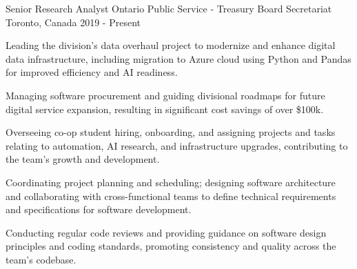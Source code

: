 

\begin{cventries}


\cventry
  {Senior Research Analyst}
  {Ontario Public Service - Treasury Board Secretariat}
  {Toronto, Canada}
  {2019 - Present}
  {
    \begin{cvitems}
      \item Leading the division's data overhaul project to modernize and enhance digital data infrastructure, including migration to Azure cloud using Python and Pandas for improved efficiency and AI readiness.
      \item Managing software procurement and guiding divisional roadmaps for future digital service expansion, resulting in significant cost savings of over \$100k.
      \item Overseeing co-op student hiring, onboarding, and assigning projects and tasks relating to automation, AI research, and infrastructure upgrades, contributing to the team's growth and development.
      \item Coordinating project planning and scheduling; designing software architecture and collaborating with cross-functional teams to define technical requirements and specifications for software development.
      \item Conducting regular code reviews and providing guidance on software design principles and coding standards, promoting consistency and quality across the team's codebase.
    \end{cvitems}
  }


\end{cventries}
